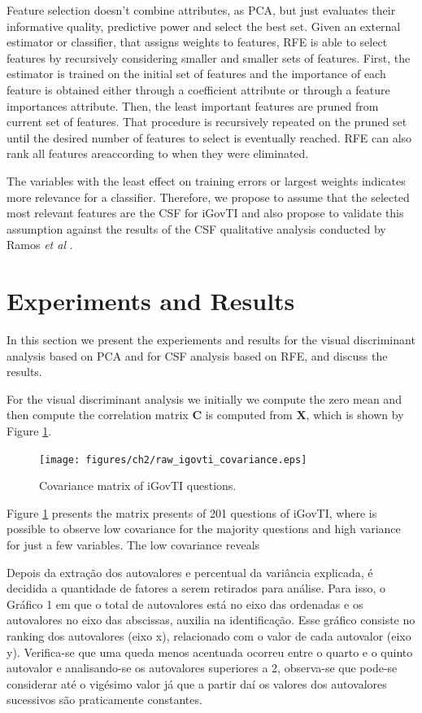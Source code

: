 Feature selection doesn't combine attributes, as PCA, but just evaluates their informative quality, predictive power and select the best set. Given an external estimator or classifier, that assigns weights to features, RFE is able to select features by recursively considering smaller and smaller sets of features. First, the estimator is trained on the initial set of features and the importance of each feature is obtained either through a coefficient attribute or through a feature importances attribute. Then, the least important features are pruned from current set of features. That procedure is recursively repeated on the pruned set until the desired number of features to select is eventually reached. RFE can also rank all features areaccording to when they were eliminated. 

The variables with the least effect on training errors or largest weights indicates more relevance for a classifier. Therefore, we propose to assume that the selected most relevant features are the CSF for iGovTI and also propose to validate this assumption against the results of the CSF qualitative analysis conducted by Ramos \emph{et al} \cite{ramos2016information}.

\section{Experiments and Results}
\label{sec:ch2_experimentalresults}

In this section we present the experiements and results for the visual discriminant analysis based on PCA and for CSF analysis based on RFE, and discuss the results.

For the visual discriminant analysis we initially we compute the zero mean and then compute the correlation matrix $\mathbf{C}$ is computed from $\mathbf{X}$, which is shown by Figure \ref{fig:ch2_fig1}.
 
\begin{figure}[h!]
     \centering 
     \texttt{[image: figures/ch2/raw\_igovti\_covariance.eps]}
     \caption{Covariance matrix of iGovTI questions.}
     \label{fig:ch2_fig1}
\end{figure}

Figure \ref{fig:ch2_fig1} presents the matrix presents of 201 questions of iGovTI, where is possible to observe low covariance for the majority questions and high variance for just a few variables. The low covariance reveals

Depois da extração dos autovalores e percentual da variância explicada, é decidida a quantidade de fatores a serem retirados para análise. Para isso, o Gráfico 1 em que o total de autovalores está no eixo das ordenadas e os autovalores  no eixo das abscissas, auxilia na identificação. Esse gráfico consiste no ranking dos autovalores (eixo x), relacionado com o valor de cada autovalor (eixo y). Verifica-se que uma queda menos acentuada ocorreu entre o quarto e o quinto autovalor e analisando-se os autovalores superiores a 2, observa-se que pode-se considerar até o vigésimo valor já que a partir daí os valores dos autovalores sucessivos são praticamente constantes.

